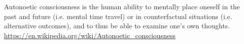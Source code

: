 \documentclass[a4paper]{article}
\title{}
\date{}
\begin{document}
    \maketitle
    Autonoetic consciousness is the human ability to mentally place oneself in the past and future (i.e. mental time travel) or in counterfactual situations (i.e. alternative outcomes), and to thus be able to examine one's own thoughts.
    \url{https://en.wikipedia.org/wiki/Autonoetic_consciousness}
\end{document}
